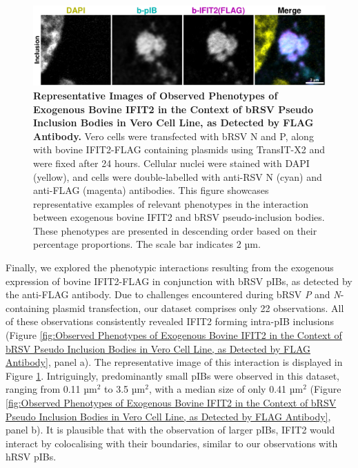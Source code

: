 \begin{figure}
    \centering
    \includegraphics[width=1\linewidth]{09. Chapter 4/Figs/01. pIB/03. IFIT2/04. IFIT2-FLAG/03. FLAG/09. bi2f-bnbp.pdf}
    \caption[Representative Images of Observed Phenotypes of Exogenous Bovine IFIT2 in the Context of bRSV Pseudo Inclusion Bodies in Vero Cell Line, as Detected by FLAG Antibody.]{\textbf{Representative Images of Observed Phenotypes of Exogenous Bovine IFIT2 in the Context of bRSV Pseudo Inclusion Bodies in Vero Cell Line, as Detected by FLAG Antibody.} Vero cells were transfected with bRSV N and P, along with bovine IFIT2-FLAG containing plasmids using TransIT-X2 and were fixed after 24 hours. Cellular nuclei were stained with DAPI (yellow), and cells were double-labelled with anti-RSV N (cyan) and anti-FLAG (magenta) antibodies. This figure showcases representative examples of relevant phenotypes in the interaction between exogenous bovine IFIT2 and bRSV pseudo-inclusion bodies. These phenotypes are presented in descending order based on their percentage proportions. The scale bar indicates 2 µm.}
    \label{fig:Representative Images of Observed Phenotypes of Exogenous Bovine IFIT2 in the Context of bRSV Pseudo Inclusion Bodies in Vero Cell Line, as Detected by FLAG Antibody}
\end{figure}

Finally, we explored the phenotypic interactions resulting from the exogenous expression of bovine IFIT2-FLAG in conjunction with bRSV pIBs, as detected by the anti-FLAG antibody. Due to challenges encountered during bRSV \textit{P} and \textit{N}-containing plasmid transfection, our dataset comprises only 22 observations. All of these observations consistently revealed IFIT2 forming intra-pIB inclusions (Figure \ref{fig:Observed Phenotypes of Exogenous Bovine IFIT2 in the Context of bRSV Pseudo Inclusion Bodies in Vero Cell Line, as Detected by FLAG Antibody}, panel a). The representative image of this interaction is displayed in Figure \ref{fig:Representative Images of Observed Phenotypes of Exogenous Bovine IFIT2 in the Context of bRSV Pseudo Inclusion Bodies in Vero Cell Line, as Detected by FLAG Antibody}. Intriguingly, predominantly small pIBs were observed in this dataset, ranging from 0.11 \(\mbox{µm}^2\) to 3.5 \(\mbox{µm}^2\), with a median size of only 0.41 \(\mbox{µm}^2\) (Figure \ref{fig:Observed Phenotypes of Exogenous Bovine IFIT2 in the Context of bRSV Pseudo Inclusion Bodies in Vero Cell Line, as Detected by FLAG Antibody}, panel b). It is plausible that with the observation of larger pIBs, IFIT2 would interact by colocalising with their boundaries, similar to our observations with hRSV pIBs.

